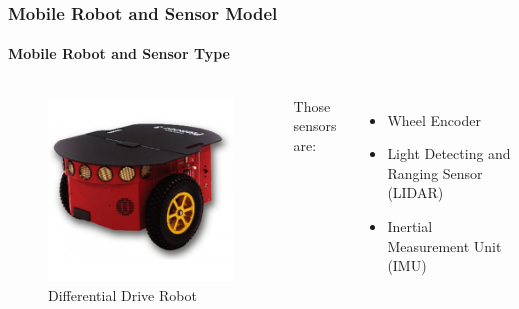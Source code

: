 \begin{frame}
	\frametitle{Mobile Robot and Sensor Model}
	\framesubtitle{Mobile Robot and Sensor Type}
	\begin{columns}
		\begin{figure}
			\caption{Differential Drive Robot\footnotemark}
			\includegraphics[scale=0.3]{image/DDWMR.jpg}
		\end{figure}
		
		Those sensors are:
		\begin{itemize}
			\item Wheel Encoder
			\item Light Detecting and Ranging Sensor (LIDAR)
			\item Inertial Measurement Unit (IMU)
		\end{itemize}
	\end{columns}
\end{frame}


